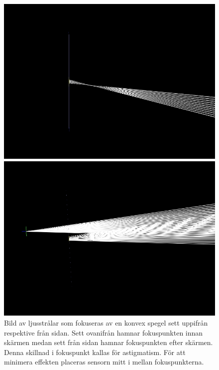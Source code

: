 \documentclass[a4paper]{article}
\begin{document}
\FloatBarrier
\begin{figure}[h]
	\centering
	\begin{minipage}[b]{0.4\textwidth}
		\includegraphics[width=\textwidth]{Data/FRED/FRED1.jpg}
	\end{minipage}
	\hspace{10pt}
	\begin{minipage}[b]{0.4\textwidth}
		\includegraphics[width=\textwidth]{Data/FRED/FRED2.jpg}
	\end{minipage}
	\caption{Bild av ljusstrålar som fokuseras av en konvex spegel sett uppifrån respektive från sidan. Sett ovanifrån hamnar fokuspunkten innan skärmen medan sett från sidan hamnar fokuspunkten efter skärmen. Denna skillnad i fokuspunkt kallas för astigmatism. För att minimera effekten placeras sensorn mitt i mellan fokuspunkterna.}
	\label{fig:astigmBoth}
\end{figure}
\FloatBarrier
\end{document}
